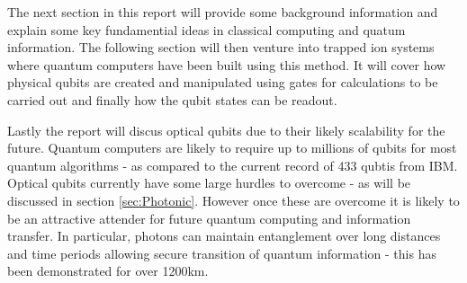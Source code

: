 \vspace{1em}
The next section in this report will provide some background information and explain some key fundamential ideas in classical computing and quatum information. 
The following section will then venture into trapped ion systems where quantum computers have been built using this method.
It will cover how physical qubits are created and manipulated using gates for calculations to be carried out and finally how the qubit states can be readout. 

\vspace{1em}
Lastly the report will discus optical qubits due to their likely scalability for the future. 
Quantum computers are likely to require up to millions of qubits for most quantum algorithms - as compared to the current record of 433 qubtis from IBM. \cite{bergou_quantum_2021} 
Optical qubits currently have some large hurdles to overcome - as will be discussed in section \ref{sec:Photonic}. 
However once these are overcome it is likely to be an attractive attender for future quantum computing and information transfer.
In particular, photons can maintain entanglement over long distances and time periods allowing secure transition of quantum information - this has been demonstrated for over 1200km. \cite{yin_satellite-based_2017}